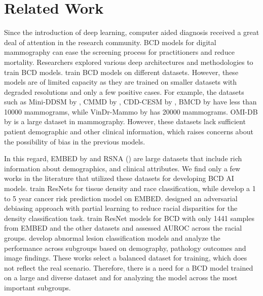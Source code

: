 \section{Related Work}
\label{related_work}
Since the introduction of deep learning, computer aided diagnosis received a great deal of attention in the research community. BCD models for digital mammography can ease the screening process for practitioners and reduce mortality. Researchers explored various deep architectures and methodologies to train BCD models. \cite{sahu2023recent,raiaan2024mammo,qureshi2024breast,mahoro2022applying,petrini2022breast,wang2023evaluating,altameem2022breast,shen2019deep} train BCD models on different datasets. However, these models are of limited capacity as they are trained on smaller datasets with degraded resolutions and only a few positive cases. For example, the datasets such as Mini-DDSM by \cite{lekamlage2020mini,heath1998current}, CMMD by \cite{cui2021chinese}, CDD-CESM by \cite{khaled2021categorized}, BMCD by \cite{loizidou2021digital} have less than 10000 mammograms, while VinDr-Mammo by \cite{pham2022vindr} has 20000 mammograms. OMI-DB by \cite{halling2020optimam} is a large dataset in mammography. However, these datasets lack sufficient patient demographic and other clinical information, which raises concerns about the possibility of bias in the previous models.  

In this regard, EMBED by \cite{jeong2023emory} and RSNA (\cite{rsna-breast-cancer-detection}) are large datasets that include rich information about demographics, and clinical attributes. We find only a few works in the literature that utilized these datasets for developing BCD AI models. 
\cite{khara2024generalisable} train ResNets for tissue density and race classification, while
\cite{donnelly2024asymmirai} develop a 1 to 5 year cancer risk prediction model on EMBED. 
\cite{correa2024efficient} designed an adversarial debiasing approach with partial learning to reduce racial disparities for the density classification task.
\cite{hwang2023impact} train ResNet models for BCD with only 1441 samples from EMBED and the other datasets and assessed AUROC across the racial groups.
\cite{zhang2023multivariate} develop abnormal lesion classification models and analyze the performance across subgroups based on demography, pathology outcomes and image findings. These works select a balanced dataset for training, which does not reflect the real scenario. Therefore, there is a need for a BCD model trained on a large and diverse dataset and for analyzing the model across the most important subgroups.

